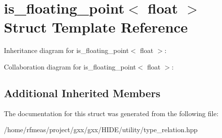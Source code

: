 \hypertarget{structis__floating__point_3_01float_01_4}{}\section{is\+\_\+floating\+\_\+point$<$ float $>$ Struct Template Reference}
\label{structis__floating__point_3_01float_01_4}


Inheritance diagram for is\+\_\+floating\+\_\+point$<$ float $>$\+:


Collaboration diagram for is\+\_\+floating\+\_\+point$<$ float $>$\+:
\subsection*{Additional Inherited Members}


The documentation for this struct was generated from the following file\+:\begin{DoxyCompactItemize}
\item 
/home/rfmeas/project/gxx/gxx/\+H\+I\+D\+E/utility/type\+\_\+relation.\+hpp\end{DoxyCompactItemize}
